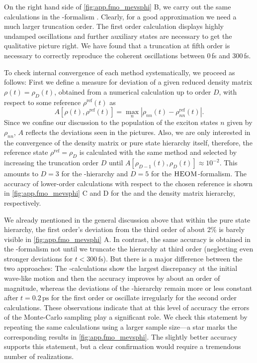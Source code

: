 On the right hand side of \autoref{fig:app.fmo_mevsphi} B, we carry out the same calculations in the \HEOM-formalism \cite{StSc12_heom}.
Clearly, for a good approximation we need a much larger truncation order.
The first order calculation displays highly undamped oscillations and further auxiliary states are necessary to get the qualitative picture right.
We have found that a truncation at fifth order is necessary to correctly reproduce the coherent oscillations between 0\,fs and 300\,fs.

To check internal convergence of each method systematically, we proceed as follows:
First we define a measure for deviation of a given reduced density matrix $\rho(t) = \rho_D(t)$, obtained from a numerical calculation up to order $D$, with respect to some reference $\rho^{\mathrm{ref}}(t)$ as
\begin{equation}
  A[\rho(t), \rho^\mathrm{ref}(t)] = \max\limits_n \left\vert \rho_{nn}(t) - \rho^{\mathrm{ref}}_{nn}(t) \right\vert.
  \label{eq:app.accuracy}
\end{equation}
Since we confine our discussion to the population of the exciton states $n$ given by $\rho_{nn}$, $A$ reflects the deviations seen in the pictures.
Also, we are only interested in the convergence of the density matrix or pure state hierarchy itself, therefore, the reference state $\rho^\mathrm{ref} = \rho_D$ is calculated  with the same method and selected by increasing the truncation order $D$ until $A[\rho_{D-1}(t), \rho_{D}(t)] \approx 10^{-2}$.
This amounts to $D=3$ for the \NMSSE-hierarchy and $D=5$ for the $\textsc{HEOM}$-formalism.
The accuracy of lower-order calculations with respect to the chosen reference is shown in \autoref{fig:app.fmo_mevsphi} C and D for the \NMSSE and the density matrix hierarchy, respectively.

We already mentioned in the general discussion above that within the pure state hierarchy, the first order's deviation from the third order of about 2\% is barely visible in \autoref{fig:app.fmo_mevsphi} A.
In contrast, the same accuracy is obtained in the \HEOM-formalism not until we truncate the hierarchy at third order (neglecting even stronger deviations for $t < 300\,\mathrm{fs}$).
But there is a major difference between the two approaches:
The \HEOM-calculations show the largest discrepancy at the initial wave-like motion and then the accuracy improves by about an order of magnitude, whereas the deviations of the \NMSSE-hierarchy remain more or less constant  after $t = 0.2\,\mathrm{ps}$ for the first order or oscillate irregularly for the second order calculations.
These observations indicate that at this level of accuracy the errors of the Monte-Carlo sampling play a significant role.
We check this statement by repeating the same calculations using a larger sample size---a star marks the corresponding results in \autoref{fig:app.fmo_mevsphi}.
The slightly better accuracy supports this statement, but a clear confirmation would require a tremendous number of realizations.\\



